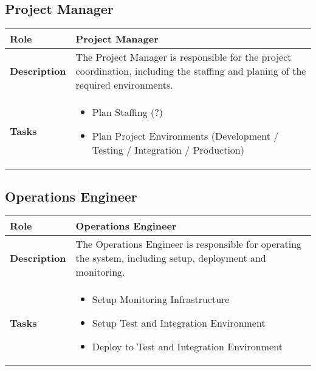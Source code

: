 \subsection{Project Manager}
\begin{minipage}{\textwidth}
 \label{table:ch6_Role_Project_Manager}
\begin{tabular}
	{|m{2cm}|m{10cm}|} \hline \bfseries Role & Project Manager\\
	\hline \bfseries Description & The Project Manager is responsible for the project coordination, including the staffing and planing of the required environments.\\
	\hline \bfseries Tasks & 
	\begin{itemize}
		\item Plan Staffing (?)
		\item Plan Project Environments (Development / Testing / Integration / Production)
	\end{itemize}
	\\
	\hline 	
\end{tabular}
\end{minipage}

\subsection{Operations Engineer}
\begin{minipage}{\textwidth}
 \label{table:ch6_Role_Operations_Engineer}
\begin{tabular}
	{|m{2cm}|m{10cm}|} \hline \bfseries Role & Operations Engineer\\
	\hline \bfseries Description & The Operations Engineer is responsible for operating the system, including setup, deployment and monitoring.\\
	\hline \bfseries Tasks & 
	\begin{itemize}
		\item Setup Monitoring Infrastructure
		\item Setup Test and Integration Environment
		\item Deploy to Test and Integration Environment 
	\end{itemize}
	\\
	\hline 
\end{tabular}
\end{minipage}

